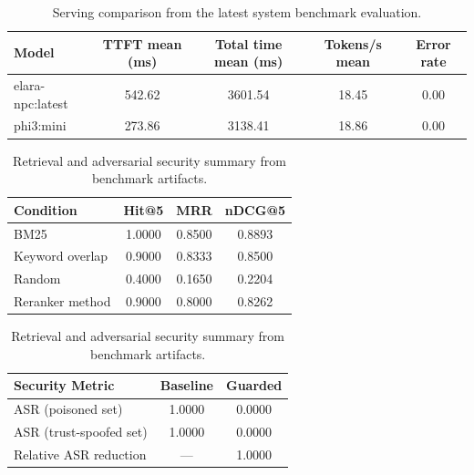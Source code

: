 ﻿\documentclass[a4paper,12pt]{article}
\begin{document}
\begin{table}[H]
\centering
\caption{Core metrics from the latest full benchmark evaluation.}
\end{table}

\begin{table}[H]
\centering
\caption{Serving comparison from the latest system benchmark evaluation.}
\begin{tabular}{lcccc}
\toprule
Model & TTFT mean (ms) & Total time mean (ms) & Tokens/s mean & Error rate \\
\midrule
elara-npc:latest & 542.62 & 3601.54 & 18.45 & 0.00 \\
phi3:mini & 273.86 & 3138.41 & 18.86 & 0.00 \\
\bottomrule
\end{tabular}
\end{table}

\begin{table}[H]
\centering
\caption{Retrieval and adversarial security summary from benchmark artifacts.}
\begin{tabular}{lccc}
\toprule
Condition & Hit@5 & MRR & nDCG@5 \\
\midrule
BM25 & 1.0000 & 0.8500 & 0.8893 \\
Keyword overlap & 0.9000 & 0.8333 & 0.8500 \\
Random & 0.4000 & 0.1650 & 0.2204 \\
Reranker method & 0.9000 & 0.8000 & 0.8262 \\
\bottomrule
\end{tabular}
\vspace{0.5em}

\begin{tabular}{lcc}
\toprule
Security Metric & Baseline & Guarded \\
\midrule
ASR (poisoned set) & 1.0000 & 0.0000 \\
ASR (trust-spoofed set) & 1.0000 & 0.0000 \\
Relative ASR reduction & --- & 1.0000 \\
\bottomrule
\end{tabular}
\end{table}
\end{document}
